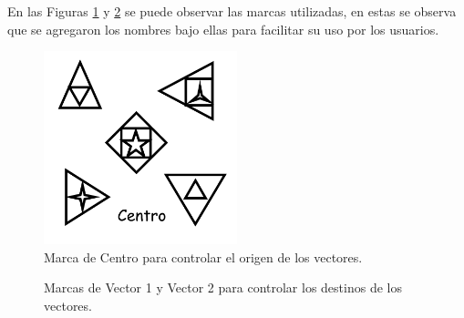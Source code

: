 En las Figuras \ref{fig:vec_centro} y \ref{fig:vec_vectores} se puede observar las marcas utilizadas, en estas se observa que se agregaron los nombres bajo ellas para facilitar su uso por los usuarios.

\begin{figure}[hbt!]
\centering
\includegraphics[width=0.5\textwidth]{figuras/vectores/ImageTarget1.png}
\caption{\label{fig:vec_centro}Marca de Centro para controlar el origen de los vectores.}
\end{figure}

\begin{figure}[hbt!]
\centering
{}
\caption{\label{fig:vec_vectores}Marcas de Vector 1 y Vector 2 para controlar los destinos de los vectores.}
\end{figure}
\FloatBarrier

